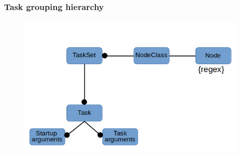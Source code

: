 \documentclass{beamer}
\begin{document}
\ThankYouFrame

\begin{frame}
\frametitle{Task grouping hierarchy}
\begin{figure}[H]
    	\centering
    	\includegraphics[scale=0.4]{images/hierarchy.png}
\end{figure}
\end{frame}





\end{document}
